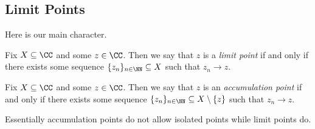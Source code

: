 \subsection{Limit Points}
Here is our main character.
\begin{definition}
	Fix $X\subseteq\CC$ and some $z\in\CC$. Then we say that $z$ is a \textit{limit point} if and only if there exists some sequence $\{z_n\}_{n\in\NN}\subseteq X$ such that $z_n\to z$.
\end{definition}
\begin{definition}
	Fix $X\subseteq\CC$ and some $z\in\CC$. Then we say that $z$ is an \textit{accumulation point} if and only if there exists some sequence $\{z_n\}_{n\in\NN}\subseteq X\setminus\{z\}$ such that $z_n\to z$.
\end{definition}
Essentially accumulation points do not allow isolated points while limit points do.

